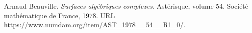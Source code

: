 Arnaud Beauville.
\newblock \emph{Surfaces alg\'ebriques complexes}.
\newblock Ast\'erisque, volume 54. Soci\'et\'e math\'ematique de France, 1978.
\newblock URL \url{https://www.numdam.org/item/AST_1978__54__R1_0/}.


